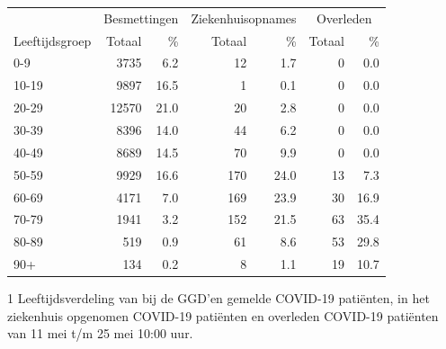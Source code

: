 \documentclass[
  english,
  man,floatsintext]{apa6}
\begin{document}
\begin{table}
\centering\begingroup\fontsize{11}{13}\selectfont

\begin{threeparttable}
\begin{tabular}{lrrrrrr}
\toprule
\multicolumn{1}{c}{ } & \multicolumn{2}{c}{Besmettingen} & \multicolumn{2}{c}{Ziekenhuisopnames} & \multicolumn{2}{c}{Overleden} \\
\cmidrule(l{3pt}r{3pt}){2-3} \cmidrule(l{3pt}r{3pt}){4-5} \cmidrule(l{3pt}r{3pt}){6-7}
Leeftijdsgroep & Totaal & \% & Totaal & \% & Totaal & \%\\
\midrule
0-9 & 3735 & 6.2 & 12 & 1.7 & 0 & 0.0\\
10-19 & 9897 & 16.5 & 1 & 0.1 & 0 & 0.0\\
20-29 & 12570 & 21.0 & 20 & 2.8 & 0 & 0.0\\
30-39 & 8396 & 14.0 & 44 & 6.2 & 0 & 0.0\\
40-49 & 8689 & 14.5 & 70 & 9.9 & 0 & 0.0\\
50-59 & 9929 & 16.6 & 170 & 24.0 & 13 & 7.3\\
60-69 & 4171 & 7.0 & 169 & 23.9 & 30 & 16.9\\
70-79 & 1941 & 3.2 & 152 & 21.5 & 63 & 35.4\\
80-89 & 519 & 0.9 & 61 & 8.6 & 53 & 29.8\\
90+ & 134 & 0.2 & 8 & 1.1 & 19 & 10.7\\
\bottomrule
\end{tabular}
\begin{tablenotes}
\item[1] Leeftijdsverdeling van bij de GGD’en gemelde COVID-19 patiënten, in het ziekenhuis opgenomen COVID-19 patiënten en overleden COVID-19 patiënten van 11 mei t/m 25 mei 10:00 uur.
\end{tablenotes}
\end{threeparttable}
\endgroup{}
\end{table}

\newpage
\end{document}
